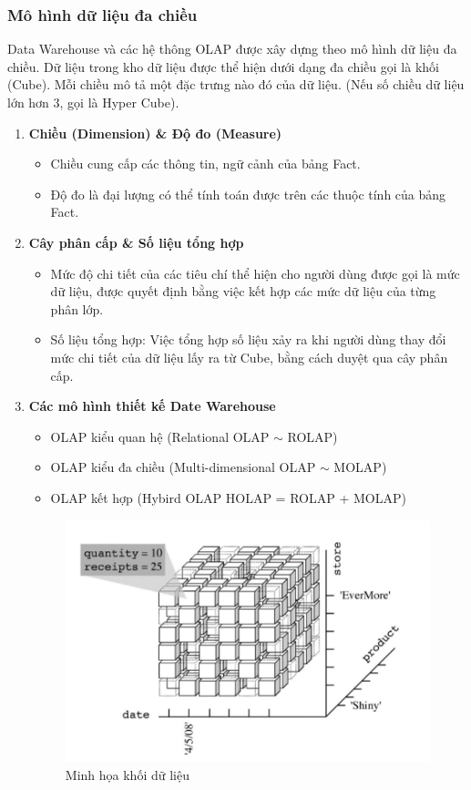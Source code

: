 \subsubsection{Mô hình dữ liệu đa chiều}
Data Warehouse và các hệ thông OLAP được xây dựng theo mô hình dữ liệu đa chiều. Dữ liệu trong kho dữ liệu được thể hiện dưới dạng đa chiều gọi là khối (Cube). Mỗi chiều mô tả một đặc trưng nào đó của dữ liệu. (Nếu số chiều dữ liệu lớn hơn 3, gọi là Hyper Cube).
\begin{enumerate}
    \item \textbf{Chiều (Dimension) \& Độ đo (Measure)}
    \begin{itemize}[label=$-$]
        \item Chiều cung cấp các thông tin, ngữ cảnh của bảng Fact.
        \item Độ đo là đại lượng có thể tính toán được trên các thuộc tính của bảng Fact.
    \end{itemize}
    \item \textbf{Cây phân cấp \& Số liệu tổng hợp}
    \begin{itemize}[label=$-$]
        \item Mức độ chi tiết của các tiêu chí thể hiện cho người dùng được gọi là mức dữ liệu, được quyết định bằng việc kết hợp các mức dữ liệu của từng phân lớp.
        \item Số liệu tổng hợp: Việc tổng hợp số liệu xảy ra khi người dùng thay đổi mức chi tiết của dữ liệu lấy ra từ Cube, bằng cách duyệt qua cây phân cấp.
    \end{itemize}
    \item  \textbf{Các mô hình thiết kế Date Warehouse}
    \begin{itemize}[label=$-$]
        \item OLAP kiểu quan hệ (Relational OLAP $\sim$ ROLAP)
        \item OLAP kiểu đa chiều (Multi-dimensional OLAP $\sim$ MOLAP)
        \item OLAP kết hợp (Hybird OLAP HOLAP = ROLAP + MOLAP)
    \end{itemize}
    \begin{center}
            \begin{figure}[!h]
                \centering
                \includegraphics[scale = 1]{figures/Duyen/Minh họa khối dữ liệu.PNG}
              \caption{Minh họa khối dữ liệu}
            \end{figure}
\end{center}
\end{enumerate}
